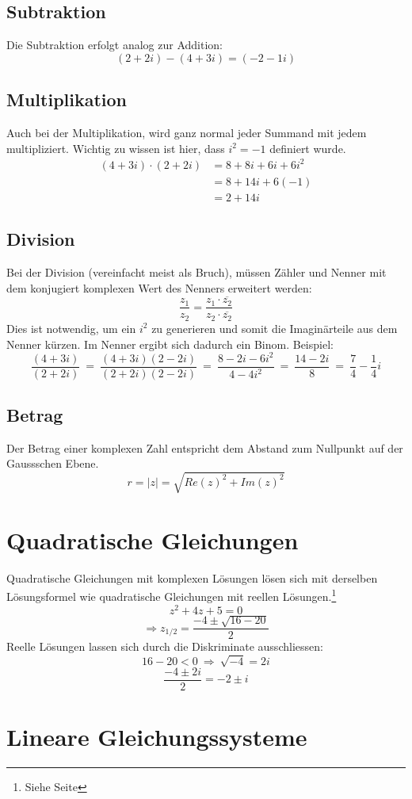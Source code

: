 \documentclass[12pt,a4paper]{scrbook}
\begin{document}
\subsection{Subtraktion}
Die Subtraktion erfolgt analog zur Addition:
\[(2+2i) - (4+3i) = (-2-1i)\]

\subsection{Multiplikation}
Auch bei der Multiplikation, wird ganz normal jeder Summand mit jedem multipliziert.
Wichtig zu wissen ist hier, dass $i^2 = -1$ definiert wurde.
\begin{equation*}
\begin{split}
(4+3i) \cdot (2+2i) & = 8 + 8i + 6i + 6i^2 \\
 & = 8 + 14i + 6(-1)\\
 & = 2 + 14i
\end{split}
\end{equation*}

\subsection{Division}
Bei der Division (vereinfacht meist als Bruch), müssen Zähler und Nenner mit
dem konjugiert komplexen Wert des Nenners erweitert werden:
\[\frac{z_1}{z_2} = \frac{z_1 \cdot \overline{z_2}}{z_2 \cdot \overline{z_2}}\]
Dies ist notwendig, um ein $i^2$ zu generieren und somit die Imaginärteile aus dem
Nenner kürzen. Im Nenner ergibt sich dadurch ein Binom. Beispiel:
\[
\frac{(4+3i)}{(2+2i)} ~ = ~ \frac{(4+3i)(2-2i)}{(2+2i)(2-2i)}
~ = ~ \frac{8-2i-6i^2}{4-4i^2} ~ = ~ \frac{14-2i}{8} ~ = ~ \frac{7}{4} - \frac{1}{4}i
\]

\subsection{Betrag}
\label{komplex_betrag}
Der Betrag einer komplexen Zahl entspricht dem Abstand zum Nullpunkt auf der
Gaussschen Ebene.
\[r = \vert z \vert = \sqrt{Re(z)^2 + Im(z)^2} \]

\section{Quadratische Gleichungen}
Quadratische Gleichungen mit komplexen Lösungen lösen sich mit derselben
Lösungsformel wie quadratische Gleichungen mit reellen Lösungen.\footnote{Siehe Seite \pageref{quadratische_gleichungen}}
\[z^2 + 4z + 5 = 0\]
\[\Rightarrow z_{1/2} = \frac{-4 \pm \sqrt{16-20}}{2} \]
Reelle Lösungen lassen sich durch die Diskriminate ausschliessen:
\[16-20 < 0 ~ \Longrightarrow ~ \sqrt{-4} = 2i\]
\[\frac{-4 \pm 2i}{2} = -2 \pm i\]

\section{Lineare Gleichungssysteme}
\end{document}
